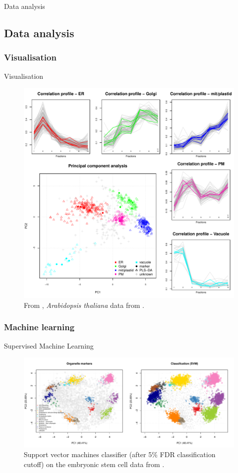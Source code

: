 \begin{frame}{}
  \begin{center}
    \Large{Data analysis}
  \end{center}
\end{frame}


\subsection*{Data analysis}
\label{sec:comp}

\subsubsection*{Visualisation}
\label{sec:viz}

\begin{frame}{Visualisation}
  \begin{figure}
    \centering
    \includegraphics[width=.6\linewidth]{figs/F04-analyses.pdf}
    \caption{From \cite{Gatto:2010}, \textit{Arabidopsis thaliana}
      data from \cite{Dunkley:2006}.}
  \end{figure}
\end{frame}

\subsubsection*{Machine learning}
\label{sec:ml}

\begin{frame}{Supervised Machine Learning}
  \begin{figure}[h]
    \centering
    \includegraphics[width=\linewidth]{figs/hyperlopit-class.pdf}
    \caption{Support vector machines classifier (after 5\% FDR
      classification cutoff) on the embryonic stem cell data from
      \cite{Christoforou:2016}.}
  \end{figure}
\end{frame}


